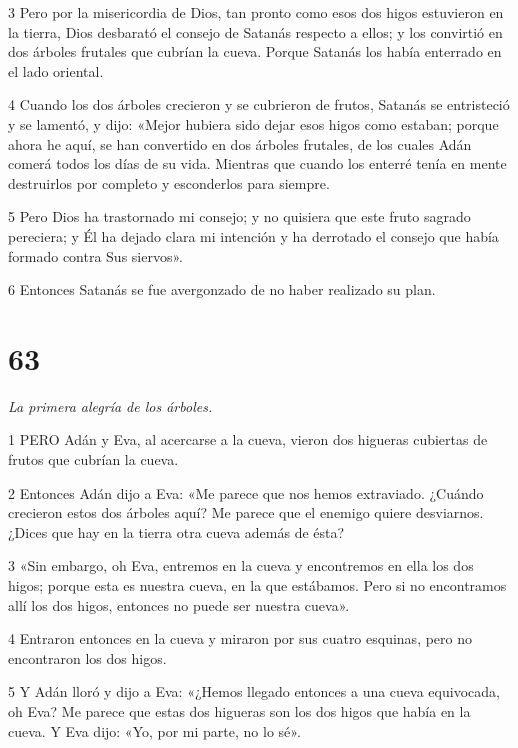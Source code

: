 \par 3 Pero por la misericordia de Dios, tan pronto como esos dos higos estuvieron en la tierra, Dios desbarató el consejo de Satanás respecto a ellos; y los convirtió en dos árboles frutales que cubrían la cueva. Porque Satanás los había enterrado en el lado oriental.

\par 4 Cuando los dos árboles crecieron y se cubrieron de frutos, Satanás se entristeció y se lamentó, y dijo: «Mejor hubiera sido dejar esos higos como estaban; porque ahora he aquí, se han convertido en dos árboles frutales, de los cuales Adán comerá todos los días de su vida. Mientras que cuando los enterré tenía en mente destruirlos por completo y esconderlos para siempre.

\par 5 Pero Dios ha trastornado mi consejo; y no quisiera que este fruto sagrado pereciera; y Él ha dejado clara mi intención y ha derrotado el consejo que había formado contra Sus siervos».

\par 6 Entonces Satanás se fue avergonzado de no haber realizado su plan.

\chapter{63}

\par \textit{La primera alegría de los árboles.}

\par 1 PERO Adán y Eva, al acercarse a la cueva, vieron dos higueras cubiertas de frutos que cubrían la cueva.

\par 2 Entonces Adán dijo a Eva: «Me parece que nos hemos extraviado. ¿Cuándo crecieron estos dos árboles aquí? Me parece que el enemigo quiere desviarnos. ¿Dices que hay en la tierra otra cueva además de ésta?

\par 3 «Sin embargo, oh Eva, entremos en la cueva y encontremos en ella los dos higos; porque esta es nuestra cueva, en la que estábamos. Pero si no encontramos allí los dos higos, entonces no puede ser nuestra cueva».

\par 4 Entraron entonces en la cueva y miraron por sus cuatro esquinas, pero no encontraron los dos higos.

\par 5 Y Adán lloró y dijo a Eva: «¿Hemos llegado entonces a una cueva equivocada, oh Eva? Me parece que estas dos higueras son los dos higos que había en la cueva. Y Eva dijo: «Yo, por mi parte, no lo sé».

